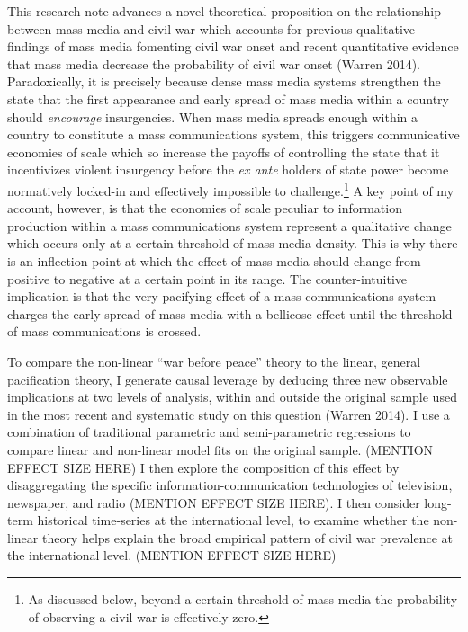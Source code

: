 \documentclass[11pt,article,oneside]{memoir}
\begin{document}
This research note advances a novel theoretical proposition on the
relationship between mass media and civil war which accounts for
previous qualitative findings of mass media fomenting civil war onset
and recent quantitative evidence that mass media decrease the
probability of civil war onset (Warren 2014). Paradoxically, it is
precisely because dense mass media systems strengthen the state that the
first appearance and early spread of mass media within a country should
\emph{encourage} insurgencies. When mass media spreads enough within a
country to constitute a mass communications system, this triggers
communicative economies of scale which so increase the payoffs of
controlling the state that it incentivizes violent insurgency before the
\emph{ex ante} holders of state power become normatively locked-in and
effectively impossible to challenge.\footnote{As discussed below, beyond
  a certain threshold of mass media the probability of observing a civil
  war is effectively zero.} A key point of my account, however, is that
the economies of scale peculiar to information production within a mass
communications system represent a qualitative change which occurs only
at a certain threshold of mass media density. This is why there is an
inflection point at which the effect of mass media should change from
positive to negative at a certain point in its range. The
counter-intuitive implication is that the very pacifying effect of a
mass communications system charges the early spread of mass media with a
bellicose effect until the threshold of mass communications is crossed.

To compare the non-linear ``war before peace'' theory to the linear,
general pacification theory, I generate causal leverage by deducing
three new observable implications at two levels of analysis, within and
outside the original sample used in the most recent and systematic study
on this question (Warren 2014). I use a combination of traditional
parametric and semi-parametric regressions to compare linear and
non-linear model fits on the original sample. (MENTION EFFECT SIZE HERE)
I then explore the composition of this effect by disaggregating the
specific information-communication technologies of television,
newspaper, and radio (MENTION EFFECT SIZE HERE). I then consider
long-term historical time-series at the international level, to examine
whether the non-linear theory helps explain the broad empirical pattern
of civil war prevalence at the international level. (MENTION EFFECT SIZE
HERE)
\end{document}
